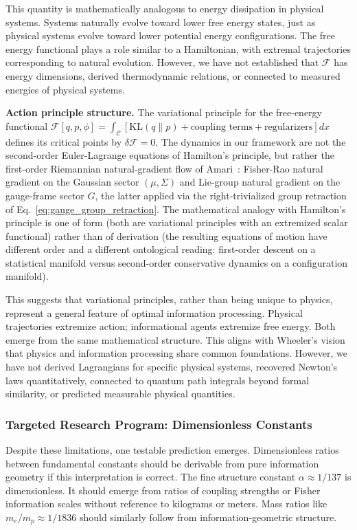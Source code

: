 \documentclass[11pt]{article}
\begin{document}
This quantity is mathematically analogous to energy dissipation in physical systems. Systems naturally evolve toward lower free energy states, just as physical systems evolve toward lower potential energy configurations. The free energy functional plays a role similar to a Hamiltonian, with extremal trajectories corresponding to natural evolution. However, we have not established that $\mathcal{F}$ has energy dimensions, derived thermodynamic relations, or connected to measured energies of physical systems.

\textbf{Action principle structure.} The variational principle for the free-energy functional $\mathcal{F}[q,p,\phi] = \int_{\mathcal{C}} [\mathrm{KL}(q \| p) + \text{coupling terms} + \text{regularizers}] dx$ defines its critical points by $\delta \mathcal{F} = 0$. The dynamics in our framework are not the second-order Euler-Lagrange equations of Hamilton's principle, but rather the first-order Riemannian natural-gradient flow of Amari~\cite{Amari1998}: Fisher-Rao natural gradient on the Gaussian sector $(\mu, \Sigma)$ and Lie-group natural gradient on the gauge-frame sector $G$, the latter applied via the right-trivialized group retraction of Eq.~\ref{eq:gauge_group_retraction}. The mathematical analogy with Hamilton's principle is one of form (both are variational principles with an extremized scalar functional) rather than of derivation (the resulting equations of motion have different order and a different ontological reading: first-order descent on a statistical manifold versus second-order conservative dynamics on a configuration manifold).

This suggests that variational principles, rather than being unique to physics, represent a general feature of optimal information processing. Physical trajectories extremize action; informational agents extremize free energy. Both emerge from the same mathematical structure. This aligns with Wheeler's vision that physics and information processing share common foundations. However, we have not derived Lagrangians for specific physical systems, recovered Newton's laws quantitatively, connected to quantum path integrals beyond formal similarity, or predicted measurable physical quantities.

\subsubsection{Targeted Research Program: Dimensionless Constants}

Despite these limitations, one testable prediction emerges. Dimensionless ratios between fundamental constants should be derivable from pure information geometry if this interpretation is correct. The fine structure constant $\alpha \approx 1/137$ is dimensionless.  It should emerge from ratios of coupling strengths or Fisher information scales without reference to kilograms or meters. Mass ratios like $m_e/m_p \approx 1/1836$ should similarly follow from information-geometric structure.
\end{document}
